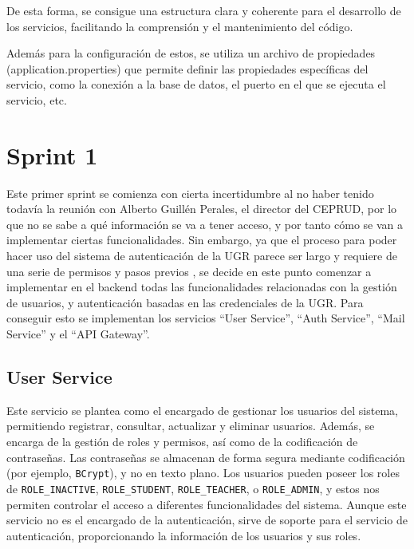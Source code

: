 De esta forma, se consigue una estructura clara y coherente para el desarrollo de los servicios, facilitando la comprensión y el mantenimiento del código.

Además para la configuración de estos, se utiliza un archivo de propiedades (application.properties) que permite definir las propiedades específicas del servicio, como la conexión a la base de datos, el puerto en el que se ejecuta el servicio, etc.

\section{Sprint 1}

Este primer sprint se comienza con cierta incertidumbre al no haber tenido todavía la reunión con Alberto Guillén Perales, el director del CEPRUD, por lo que no se sabe a qué información se va a tener acceso, y por tanto cómo se van a implementar ciertas funcionalidades.
\newline\newline
Sin embargo, ya que el proceso para poder hacer uso del sistema de autenticación de la UGR parece ser largo y requiere de una serie de permisos y pasos previos \cite{autenticacion_ugr}, se decide en este punto comenzar a implementar en el backend todas las funcionalidades relacionadas con la gestión de usuarios, y autenticación basadas en las credenciales de la UGR.
\newline\newline
Para conseguir esto se implementan los servicios ``User Service'', ``Auth Service'', ``Mail Service'' y el ``API Gateway''.

\subsection{User Service}

Este servicio se plantea como el encargado de gestionar los usuarios del sistema, permitiendo registrar, consultar, actualizar y eliminar usuarios. Además, se encarga de la gestión de roles y permisos, así como de la codificación de contraseñas.
\newline 
Las contraseñas se almacenan de forma segura mediante codificación (por ejemplo, \texttt{BCrypt}), y no en texto plano.
\newline\newline
Los usuarios pueden poseer los roles de \texttt{ROLE\_INACTIVE}, \texttt{ROLE\_STUDENT}, \texttt{ROLE\_TEACHER}, o \texttt{ROLE\_ADMIN}, y estos nos permiten controlar el acceso a diferentes funcionalidades del sistema.
\newline\newline
Aunque este servicio no es el encargado de la autenticación, sirve de soporte para el servicio de autenticación, proporcionando la información de los usuarios y sus roles.

